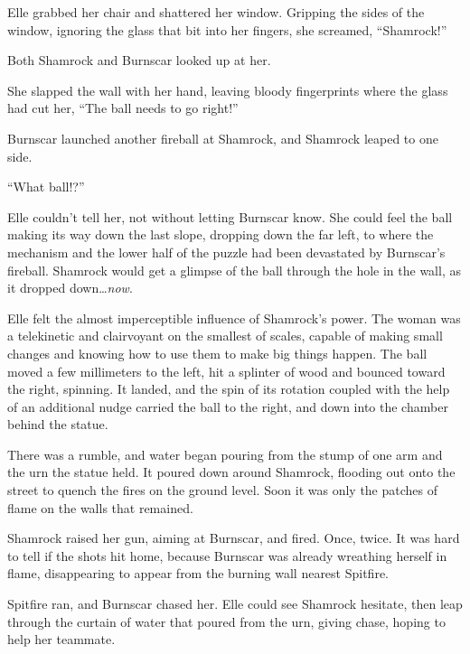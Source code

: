 Elle grabbed her chair and shattered her window.  Gripping the sides of the window, ignoring the glass that bit into her fingers, she screamed, ``Shamrock!''



Both Shamrock and Burnscar looked up at her.



She slapped the wall with her hand, leaving bloody fingerprints where the glass had cut her, ``The ball needs to go right!''



Burnscar launched another fireball at Shamrock, and Shamrock leaped to one side.



``What ball!?''



Elle couldn't tell her, not without letting Burnscar know.  She could feel the ball making its way down the last slope, dropping down the far left, to where the mechanism and the lower half of the puzzle had been devastated by Burnscar's fireball.  Shamrock would get a glimpse of the ball through the hole in the wall, as it dropped down\ldots \emph{now}.



Elle felt the almost imperceptible influence of Shamrock's power.  The woman was a telekinetic and clairvoyant on the smallest of scales, capable of making small changes and knowing how to use them to make big things happen.  The ball moved a few millimeters to the left, hit a splinter of wood and bounced toward the right, spinning.  It landed, and the spin of its rotation coupled with the help of an additional nudge carried the ball to the right, and down into the chamber behind the statue.



There was a rumble, and water began pouring from the stump of one arm and the urn the statue held.  It poured down around Shamrock, flooding out onto the street to quench the fires on the ground level.  Soon it was only the patches of flame on the walls that remained.



Shamrock raised her gun, aiming at Burnscar, and fired.  Once, twice.  It was hard to tell if the shots hit home, because Burnscar was already wreathing herself in flame, disappearing to appear from the burning wall nearest Spitfire.



Spitfire ran, and Burnscar chased her.  Elle could see Shamrock hesitate, then leap through the curtain of water that poured from the urn, giving chase, hoping to help her teammate.



